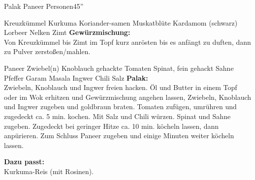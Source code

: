 \begin{MyRecipe}{Palak Paneer}{ Personen}{45''}

 {Kreuzkümmel}
 {Kurkuma}
 {Koriander-samen}
 {Muskatblüte}
 {Kardamom (schwarz)}
\ingredient[\Calc{1}{\x}]{} {Lorbeer}
 {Nelken}
 {Zimt}
\textbf{Gewürzmischung:}\\
Von Kreuzkümmel bis Zimt im Topf kurz anrösten bis es anfängt zu duften, dann zu Pulver zerstoßen/mahlen.\\\par\bigskip


 {Paneer}
 {Zwiebel(n)}
 {Knoblauch}
 {gehackte Tomaten}
 {Spinat, fein gehackt}
 {Sahne}
 {Pfeffer}
 {Garam Masala}
 {Ingwer}
\ingredient[]{} {Chili}
\ingredient[]{} {Salz}
\textbf{Palak:}\\
Zwiebeln, Knoblauch und Ingwer freien hacken. Öl und Butter in einem Topf oder im Wok erhitzen und Gewürzmischung angehen lassen, Zwiebeln, Knoblauch und Ingwer zugeben und goldbraun braten. Tomaten zufügen, umrühren und zugedeckt ca. 5 min. kochen. Mit Salz und Chili würzen. Spinat und Sahne zugeben. Zugedeckt bei geringer Hitze ca. 10 min. köcheln lassen, dann anpürieren. Zum Schluss Paneer zugeben und einige Minuten weiter köcheln lassen.\\\par\bigskip

\textbf{Dazu passt:}\\
Kurkuma-Reis (mit Rosinen).



			
\end{MyRecipe}